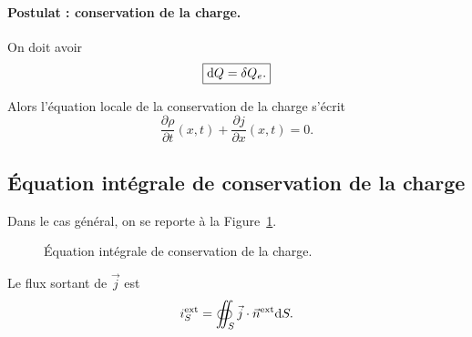         \paragraph{Postulat : conservation de la charge.}

            On doit avoir 
            \begin{equation}
                \boxed{
                    \mathrm{d} Q=\delta Q_e.
                }
            \end{equation}

            Alors l'équation locale de la conservation de la charge s'écrit
            \begin{equation}
                \boxed{
                    \frac{\partial\rho}{\partial t}(x,t)+\frac{\partial j}{\partial x}(x,t)=0.
                }
            \end{equation}

    \subsection{Équation intégrale de conservation de la charge}

        Dans le cas général, on se reporte à la Figure~\ref{fig:equation_integrale_conservation_charge}.

        \begin{figure}
            \centering
            \caption{Équation intégrale de conservation de la charge.}    
            \label{fig:equation_integrale_conservation_charge}
        \end{figure}

        Le flux sortant de $\vec{j}$ est 
        \begin{equation}
            i_S^{\text{ext}}=\oiint_{S}\vec{j}\cdot\vec{n}^{\text{ext}}\mathrm{d} S.
        \end{equation}

